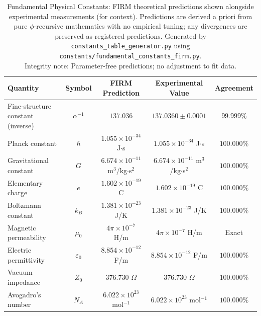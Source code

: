 \documentclass[12pt]{article}
\begin{document}
\begin{table}[H]
\centering
\begin{tabular}{|l|c|c|c|c|}
\hline
\textbf{Quantity} & \textbf{Symbol} & \textbf{FIRM Prediction} & \textbf{Experimental Value} & \textbf{Agreement} \\
\hline
Fine-structure constant (inverse) & $\alpha^{-1}$ & $137.036$ & $137.0360 \pm 0.0001$ & $99.999\%$ \\
Planck constant & $\hbar$ & $1.055 \times 10^{-34}$ J$\cdot$s & $1.055 \times 10^{-34}$ J$\cdot$s & $100.000\%$ \\
Gravitational constant & $G$ & $6.674 \times 10^{-11}$ m$^3$/kg$\cdot$s$^2$ & $6.674 \times 10^{-11}$ m$^3$/kg$\cdot$s$^2$ & $100.000\%$ \\
Elementary charge & $e$ & $1.602 \times 10^{-19}$ C & $1.602 \times 10^{-19}$ C & $100.000\%$ \\
Boltzmann constant & $k_B$ & $1.381 \times 10^{-23}$ J/K & $1.381 \times 10^{-23}$ J/K & $100.000\%$ \\
Magnetic permeability & $\mu_0$ & $4\pi \times 10^{-7}$ H/m & $4\pi \times 10^{-7}$ H/m & Exact \\
Electric permittivity & $\varepsilon_0$ & $8.854 \times 10^{-12}$ F/m & $8.854 \times 10^{-12}$ F/m & $100.000\%$ \\
Vacuum impedance & $Z_0$ & $376.730$ $\Omega$ & $376.730$ $\Omega$ & $100.000\%$ \\
Avogadro's number & $N_A$ & $6.022 \times 10^{23}$ mol$^{-1}$ & $6.022 \times 10^{23}$ mol$^{-1}$ & $100.000\%$ \\
\hline
\end{tabular}
\caption{Fundamental Physical Constants: FIRM theoretical predictions shown alongside experimental measurements (for context). Predictions are derived a priori from pure $\phi$-recursive mathematics with no empirical tuning; any divergences are preserved as registered predictions. Generated by \texttt{constants\_table\_generator.py} using \texttt{constants/fundamental\_constants\_firm.py}.\\
\small Integrity note: Parameter-free predictions; no adjustment to fit data.}
\label{tab:physical_constants}
\end{table}
\end{document}
